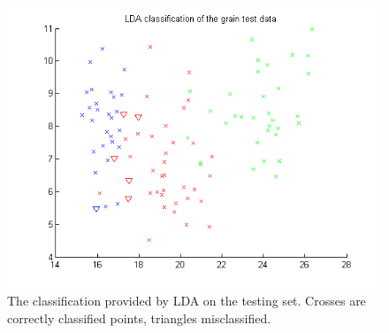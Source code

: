 \documentclass[11pt,a4paper]{article}
\begin{document}
\begin{figure}[h!]
    \centering
    \includegraphics[width=.75\textwidth]{images/seeds-lda-test}
    \caption{The classification provided by LDA on the testing set. Crosses are correctly classified points, triangles misclassified.}
    \label{seeds-lda-test}
\end{figure}
\end{document}
